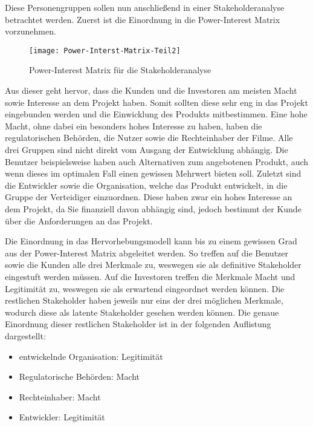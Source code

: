 Diese Personengruppen sollen nun anschließend in einer Stakeholderanalyse betrachtet werden.
Zuerst ist die Einordnung in die Power-Interest Matrix vorzunehmen.
\begin{figure}[ht]
    \centering
    \texttt{[image: Power-Interst-Matrix-Teil2]}
    \caption{Power-Interest Matrix für die Stakeholderanalyse}
    \label{fig:power-interest-matrix2}
\end{figure}

Aus dieser geht hervor, dass die Kunden und die Investoren am meisten Macht sowie Interesse an dem Projekt haben.
Somit sollten diese sehr eng in das Projekt eingebunden werden und die Einwicklung des Produkts mitbestimmen.
Eine hohe Macht, ohne dabei ein besonders hohes Interesse zu haben, haben die regulatorischen Behörden, die Nutzer sowie die Rechteinhaber der Filme.
Alle drei Gruppen sind nicht direkt vom Ausgang der Entwicklung abhängig.
Die Benutzer beispielsweise haben auch Alternativen zum angebotenen Produkt, auch wenn dieses im optimalen Fall einen gewissen Mehrwert bieten soll.
Zuletzt sind die Entwickler sowie die Organisation, welche das Produkt entwickelt, in die Gruppe der Verteidiger einzuordnen.
Diese haben zwar ein hohes Interesse an dem Projekt, da Sie finanziell davon abhängig sind, jedoch bestimmt der Kunde über die Anforderungen an das Projekt.

Die Einordnung in das Hervorhebungsmodell kann bis zu einem gewissen Grad aus der Power-Interest Matrix abgeleitet werden.
So treffen auf die Benutzer sowie die Kunden alle drei Merkmale zu, weswegen sie als definitive Stakeholder eingestuft werden müssen.
Auf die Investoren treffen die Merkmale Macht und Legitimität zu, weswegen sie als erwartend eingeordnet werden können.
Die restlichen Stakeholder haben jeweils nur eins der drei möglichen Merkmale, wodurch diese als latente Stakeholder gesehen werden können.
Die genaue Einordnung dieser restlichen Stakeholder ist in der folgenden Auflistung dargestellt:

\begin{itemize}
    \item entwickelnde Organisation: Legitimität
    \item Regulatorische Behörden: Macht
    \item Rechteinhaber: Macht
    \item Entwickler: Legitimität
\end{itemize}

